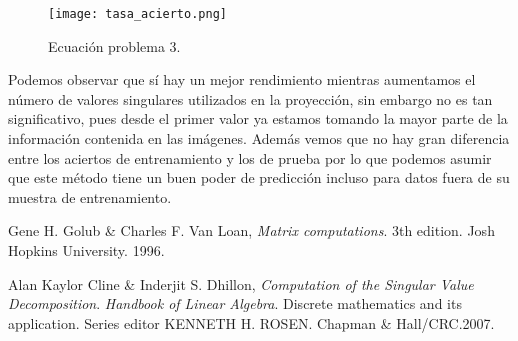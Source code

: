\documentclass[12pt]{article}
\begin{document}
\begin{figure}[H]
\centering
\texttt{[image: tasa\_acierto.png]}
\caption{\label{fig:p2}Ecuación problema 3.}
\end{figure}

Podemos observar que sí hay un mejor rendimiento mientras aumentamos el número de valores singulares utilizados en la proyección, sin embargo no es tan significativo, pues desde el primer valor ya estamos tomando la mayor parte de la información contenida en las imágenes. Además vemos que no hay gran diferencia entre los aciertos de entrenamiento y los de prueba por lo que podemos asumir que este método tiene un buen poder de predicción incluso para datos fuera de su muestra de entrenamiento.


\item Gene H. Golub & Charles F. Van Loan, \textit{Matrix computations}. 3th edition. Josh Hopkins University. 1996.

\item Alan Kaylor Cline & Inderjit S. Dhillon, \textit{Computation of the Singular Value Decomposition}. \textit{Handbook of Linear Algebra}. Discrete mathematics and its application. Series editor KENNETH H. ROSEN. Chapman & Hall/CRC.2007.


\end{document}
